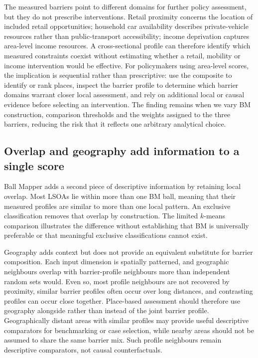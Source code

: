 \documentclass[11pt,a4paper]{article}
\begin{document}
The measured barriers point to different domains for further policy assessment, but they do not prescribe interventions. Retail proximity concerns the location of included retail opportunities; household car availability describes private-vehicle resources rather than public-transport accessibility; income deprivation captures area-level income resources. A cross-sectional profile can therefore identify which measured constraints coexist without estimating whether a retail, mobility or income intervention would be effective. For policymakers using area-level scores, the implication is sequential rather than prescriptive: use the composite to identify or rank places, inspect the barrier profile to determine which barrier domains warrant closer local assessment, and rely on additional local or causal evidence before selecting an intervention. The finding remains when we vary BM construction, comparison thresholds and the weights assigned to the three barriers, reducing the risk that it reflects one arbitrary analytical choice.

\subsection{Overlap and geography add information to a single score}
Ball Mapper adds a second piece of descriptive information by retaining local overlap. Most LSOAs lie within more than one BM ball, meaning that their measured profiles are similar to more than one local pattern. An exclusive classification removes that overlap by construction. The limited $k$-means comparison illustrates the difference without establishing that BM is universally preferable or that meaningful exclusive classifications cannot exist.

Geography adds context but does not provide an equivalent substitute for barrier composition. Each input dimension is spatially patterned, and geographic neighbours overlap with barrier-profile neighbours more than independent random sets would. Even so, most profile neighbours are not recovered by proximity, similar barrier profiles often occur over long distances, and contrasting profiles can occur close together. Place-based assessment should therefore use geography alongside rather than instead of the joint barrier profile. Geographically distant areas with similar profiles may provide useful descriptive comparators for benchmarking or case selection, while nearby areas should not be assumed to share the same barrier mix. Such profile neighbours remain descriptive comparators, not causal counterfactuals.
\end{document}
